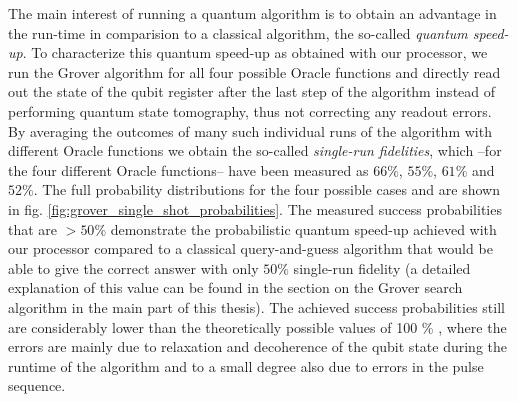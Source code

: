 The main interest of running a quantum algorithm is to obtain an advantage in the run-time in comparision to a classical algorithm, the so-called {\it quantum speed-up}. To characterize this quantum speed-up as obtained with our processor, we run the Grover algorithm for all four possible Oracle functions and directly read out the state of the qubit register after the last step of the algorithm instead of performing quantum state tomography, thus not correcting any readout errors. By averaging the outcomes of many such individual runs of the algorithm with different Oracle functions we obtain the so-called {\it single-run fidelities}, which --for the four different Oracle functions-- have been measured as $66 \%$, $55\%$, $61\%$ and $52\%$. The full probability distributions for the four possible cases and are shown in fig. \ref{fig:grover_single_shot_probabilities}. The measured success probabilities that are $> 50 \%$ demonstrate the probabilistic quantum speed-up achieved with our processor compared to a classical query-and-guess algorithm that would be able to give the correct answer with only $50\%$ single-run fidelity (a detailed explanation of this value can be found in the section on the Grover search algorithm in the main part of this thesis). The achieved success probabilities still are considerably lower than the theoretically possible values of 100 \% , where the errors are mainly due to relaxation and decoherence of the qubit state during the runtime of the algorithm and to a small degree also due to errors in the pulse sequence.